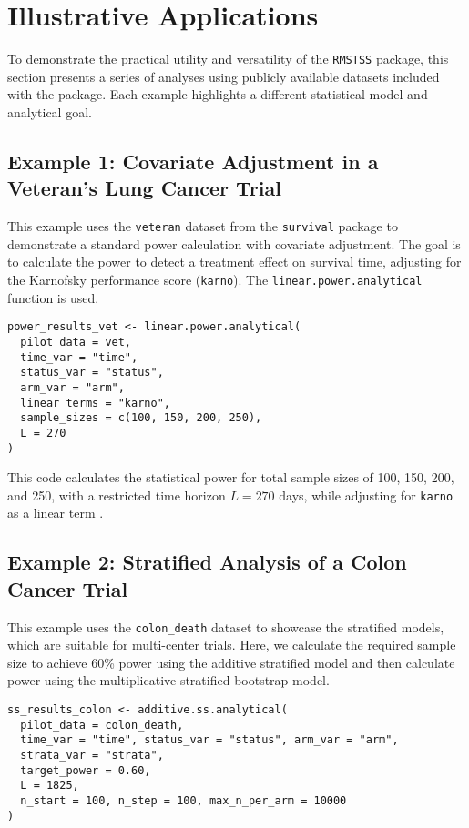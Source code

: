 \documentclass[11pt, a4paper]{article}
\begin{document}
\section{Illustrative Applications}
To demonstrate the practical utility and versatility of the \texttt{RMSTSS} package, this section presents a series of analyses using publicly available datasets included with the package. Each example highlights a different statistical model and analytical goal.

\subsection{Example 1: Covariate Adjustment in a Veteran's Lung Cancer Trial}
This example uses the \texttt{veteran} dataset from the \texttt{survival} package to demonstrate a standard power calculation with covariate adjustment. The goal is to calculate the power to detect a treatment effect on survival time, adjusting for the Karnofsky performance score (\texttt{karno}). The \texttt{linear.power.analytical} function is used.

\begin{lstlisting}
power_results_vet <- linear.power.analytical(
  pilot_data = vet,
  time_var = "time",
  status_var = "status",
  arm_var = "arm",
  linear_terms = "karno",
  sample_sizes = c(100, 150, 200, 250),
  L = 270
)
\end{lstlisting}

This code calculates the statistical power for total sample sizes of 100, 150, 200, and 250, with a restricted time horizon $L=270$ days, while adjusting for \texttt{karno} as a linear term \cite{[1]}.

\subsection{Example 2: Stratified Analysis of a Colon Cancer Trial}
This example uses the \texttt{colon\_death} dataset to showcase the stratified models, which are suitable for multi-center trials. Here, we calculate the required sample size to achieve 60\% power using the additive stratified model and then calculate power using the multiplicative stratified bootstrap model.

\begin{lstlisting}
ss_results_colon <- additive.ss.analytical(
  pilot_data = colon_death,
  time_var = "time", status_var = "status", arm_var = "arm", 
  strata_var = "strata",
  target_power = 0.60,
  L = 1825,
  n_start = 100, n_step = 100, max_n_per_arm = 10000
)
\end{lstlisting}
\end{document}
